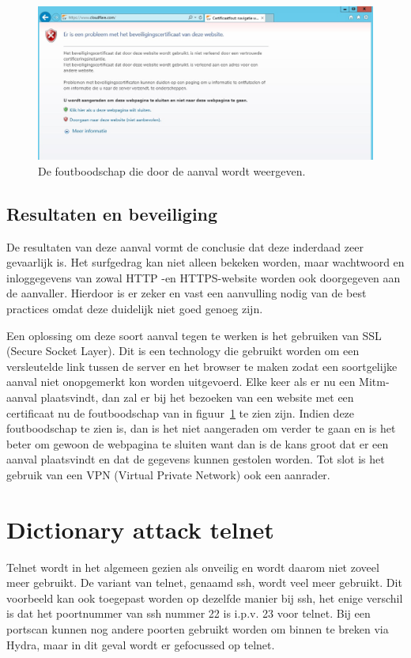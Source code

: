 \documentclass[pdftex,a4paper,12pt]{report}
\begin{document}
\begin{figure}[H]
\begin{center}
\includegraphics[scale=0.50]{img/EttercapCertificaat}
\end{center}
\caption{De foutboodschap die door de aanval wordt weergeven.}
\label{img:EttercapCertificaat}
\end{figure}

\subsection{Resultaten en beveiliging}
De resultaten van deze aanval vormt de conclusie dat deze inderdaad zeer gevaarlijk is. Het surfgedrag kan niet alleen bekeken worden, maar wachtwoord en inloggegevens van zowal HTTP -en HTTPS-website worden ook doorgegeven aan de aanvaller. Hierdoor is er zeker en vast een aanvulling nodig van de best practices omdat deze duidelijk niet goed genoeg zijn. \newline

Een oplossing om deze soort aanval tegen te werken is het gebruiken van SSL (Secure Socket Layer). Dit is een technology die gebruikt worden om een versleutelde link tussen de server en het browser te maken zodat een soortgelijke aanval niet onopgemerkt kon worden uitgevoerd. Elke keer als er nu een Mitm-aanval plaatsvindt, dan zal er bij het bezoeken van een website met een certificaat nu de foutboodschap van in figuur~\ref{img:EttercapCertificaat} te zien zijn. Indien deze foutboodschap te zien is, dan is het niet aangeraden om verder te gaan en is het beter om gewoon de webpagina te sluiten want dan is de kans groot dat er een aanval plaatsvindt en dat de gegevens kunnen gestolen worden. Tot slot is het gebruik van een VPN (Virtual Private Network) ook een aanrader.

\section{Dictionary attack telnet}
Telnet wordt in het algemeen gezien als onveilig en wordt daarom niet zoveel meer gebruikt. De variant van telnet, genaamd ssh, wordt veel meer gebruikt. Dit voorbeeld kan ook toegepast worden op dezelfde manier bij ssh, het enige verschil is dat het poortnummer van ssh nummer 22 is i.p.v. 23 voor telnet. Bij een portscan kunnen nog andere poorten gebruikt worden om binnen te breken via Hydra, maar in dit geval wordt er gefocussed op telnet.
\end{document}
